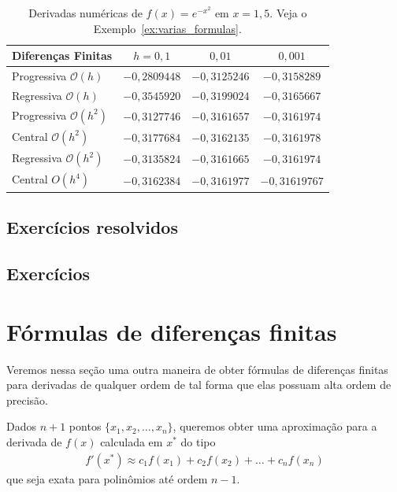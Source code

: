 \begin{sol}
\begin{table}
  \centering
  \begin{tabular}{l|ccc}
    Diferenças Finitas & $h=0,1$ & $0,01$ & $0,001$\\\hline
    Progressiva $\mathcal{O}(h)$ & $-0,2809448$ & $-0,3125246$ & $-0,3158289$\\
    Regressiva $\mathcal{O}(h)$ & $-0,3545920$ & $-0,3199024$ & $-0,3165667$\\
    Progressiva $\mathcal{O}(h^2)$ & $-0,3127746$ & $-0,3161657$ & $-0,3161974$\\
    Central $\mathcal{O}(h^2)$ & $-0,3177684$ & $-0,3162135$ & $-0,3161978$ \\
    Regressiva $\mathcal{O}(h^2)$ & $-0,3135824$ & $-0,3161665$ & $-0,3161974$\\
    Central $O(h^4)$ & $-0,3162384$ & $-0,3161977$ & $-0,31619767$ \\\hline
  \end{tabular}
  \caption{Derivadas numéricas de $f(x) = e^{-x^ 2}$ em $x=1,5$. Veja o Exemplo~\ref{ex:varias_formulas}.}
  \label{tab:ex_varias_formulas}
\end{table}
\end{sol}

\subsection{Exercícios resolvidos}

\emconstrucao

\subsection*{Exercícios}

\emconstrucao


\section{Fórmulas de diferenças finitas}

Veremos nessa seção uma outra maneira de obter fórmulas de diferenças finitas para derivadas de qualquer ordem de tal forma que elas possuam alta ordem de precisão.

Dados $n+1$ pontos $\{x_1, x_2,\dotsc, x_n\}$, queremos obter uma aproximação para a derivada de $f(x)$ calculada em $x^*$ do tipo
\begin{eqnarray}\label{eq:regradif}
  f'(x^*)\approx c_1f(x_1)+c_2f(x_2)+\ldots +c_nf(x_n)
\end{eqnarray}
que seja exata para polinômios até ordem $n-1$.

